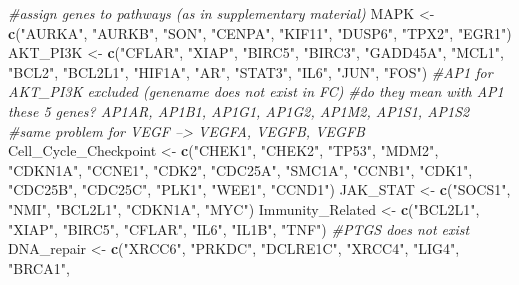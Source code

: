 \documentclass[]{article}
\newenvironment{Shaded}{\begin{snugshade}}{\end{snugshade}}
\newcommand{\CommentTok}[1]{\textcolor[rgb]{0.56,0.35,0.01}{\textit{#1}}}
\newcommand{\KeywordTok}[1]{\textcolor[rgb]{0.13,0.29,0.53}{\textbf{#1}}}
\newcommand{\NormalTok}[1]{#1}
\newcommand{\StringTok}[1]{\textcolor[rgb]{0.31,0.60,0.02}{#1}}
\begin{document}
\begin{Shaded}
\begin{Highlighting}[]
\CommentTok{#assign genes to pathways (as in supplementary material)}
\NormalTok{MAPK <-}\StringTok{ }\KeywordTok{c}\NormalTok{(}\StringTok{"AURKA"}\NormalTok{, }\StringTok{"AURKB"}\NormalTok{, }\StringTok{"SON"}\NormalTok{, }\StringTok{"CENPA"}\NormalTok{, }\StringTok{"KIF11"}\NormalTok{, }\StringTok{"DUSP6"}\NormalTok{, }\StringTok{"TPX2"}\NormalTok{, }\StringTok{"EGR1"}\NormalTok{)}
\NormalTok{AKT_PI3K <-}\StringTok{ }\KeywordTok{c}\NormalTok{(}\StringTok{"CFLAR"}\NormalTok{, }\StringTok{"XIAP"}\NormalTok{, }\StringTok{"BIRC5"}\NormalTok{, }\StringTok{"BIRC3"}\NormalTok{, }\StringTok{"GADD45A"}\NormalTok{, }\StringTok{"MCL1"}\NormalTok{, }\StringTok{"BCL2"}\NormalTok{, }
              \StringTok{"BCL2L1"}\NormalTok{, }\StringTok{"HIF1A"}\NormalTok{, }\StringTok{"AR"}\NormalTok{, }\StringTok{"STAT3"}\NormalTok{, }\StringTok{"IL6"}\NormalTok{, }\StringTok{"JUN"}\NormalTok{, }\StringTok{"FOS"}\NormalTok{)}
  \CommentTok{#AP1 for AKT_PI3K excluded (genename does not exist in FC)}
  \CommentTok{#do they mean with AP1 these 5 genes? AP1AR, AP1B1, AP1G1, AP1G2, AP1M2, AP1S1, AP1S2}
  \CommentTok{#same problem for VEGF --> VEGFA, VEGFB, VEGFB}
\NormalTok{Cell_Cycle_Checkpoint <-}\StringTok{ }\KeywordTok{c}\NormalTok{(}\StringTok{"CHEK1"}\NormalTok{, }\StringTok{"CHEK2"}\NormalTok{, }\StringTok{"TP53"}\NormalTok{, }\StringTok{"MDM2"}\NormalTok{, }\StringTok{"CDKN1A"}\NormalTok{, }\StringTok{"CCNE1"}\NormalTok{, }\StringTok{"CDK2"}\NormalTok{, }
                           \StringTok{"CDC25A"}\NormalTok{, }\StringTok{"SMC1A"}\NormalTok{, }\StringTok{"CCNB1"}\NormalTok{, }\StringTok{"CDK1"}\NormalTok{, }\StringTok{"CDC25B"}\NormalTok{, }\StringTok{"CDC25C"}\NormalTok{, }
                           \StringTok{"PLK1"}\NormalTok{, }\StringTok{"WEE1"}\NormalTok{, }\StringTok{"CCND1"}\NormalTok{)}
\NormalTok{JAK_STAT <-}\StringTok{ }\KeywordTok{c}\NormalTok{(}\StringTok{"SOCS1"}\NormalTok{, }\StringTok{"NMI"}\NormalTok{, }\StringTok{"BCL2L1"}\NormalTok{, }\StringTok{"CDKN1A"}\NormalTok{, }\StringTok{"MYC"}\NormalTok{)}
\NormalTok{Immunity_Related <-}\StringTok{ }\KeywordTok{c}\NormalTok{(}\StringTok{"BCL2L1"}\NormalTok{, }\StringTok{"XIAP"}\NormalTok{, }\StringTok{"BIRC5"}\NormalTok{, }\StringTok{"CFLAR"}\NormalTok{, }\StringTok{"IL6"}\NormalTok{, }\StringTok{"IL1B"}\NormalTok{, }\StringTok{"TNF"}\NormalTok{)}
  \CommentTok{#PTGS does not exist}
\NormalTok{DNA_repair <-}\StringTok{ }\KeywordTok{c}\NormalTok{(}\StringTok{"XRCC6"}\NormalTok{, }\StringTok{"PRKDC"}\NormalTok{, }\StringTok{"DCLRE1C"}\NormalTok{, }\StringTok{"XRCC4"}\NormalTok{, }\StringTok{"LIG4"}\NormalTok{, }\StringTok{"BRCA1"}\NormalTok{, }

\end{Highlighting}
\end{Shaded}
\end{document}

